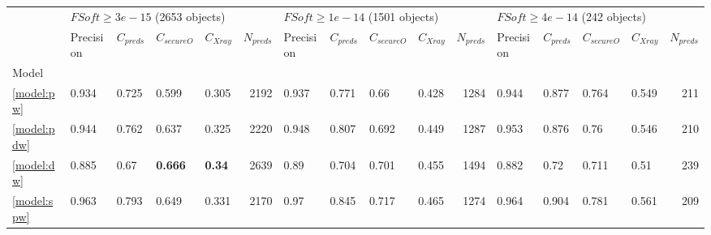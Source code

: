 \documentclass[fleqn,usenatbib]{mnras}
\begin{document}
\begin{table}
	\begin{tabular}{lllllrllllrllllr}
            \hline
            {} & \multicolumn{5}{l}{$FSoft \geq 3e-15$ (2653 objects)} & \multicolumn{5}{l}{$FSoft \geq 1e-14$ (1501 objects)} & \multicolumn{5}{l}{$FSoft \geq 4e-14$ (242 objects)} \\
            {} &                         Precision &     $C_{preds}$ &   $C_{secureO}$ &     $C_{Xray}$ & $N_{preds}$ &                         Precision &     $C_{preds}$ &   $C_{secureO}$ &      $C_{Xray}$ & $N_{preds}$ &                        Precision &     $C_{preds}$ &   $C_{secureO}$ &      $C_{Xray}$ & $N_{preds}$ \\
            Model            &                                   &                 &                 &                &             &                                   &                 &                 &                 &             &                                  &                 &                 &                 &             \\
            \hline
            \ref{model:pw}   &                             0.934 &           0.725 &           0.599 &          0.305 &        2192 &                             0.937 &           0.771 &            0.66 &           0.428 &        1284 &                            0.944 &           0.877 &           0.764 &           0.549 &         211 \\
            \ref{model:pdw}  &                             0.944 &           0.762 &           0.637 &          0.325 &        2220 &                             0.948 &           0.807 &           0.692 &           0.449 &        1287 &                            0.953 &           0.876 &            0.76 &           0.546 &         210 \\
            \ref{model:dw}   &                             0.885 &            0.67 &  \textbf{0.666} &  \textbf{0.34} &        2639 &                              0.89 &           0.704 &           0.701 &           0.455 &        1494 &                            0.882 &            0.72 &           0.711 &            0.51 &         239 \\
            \ref{model:spw}  &                             0.963 &           0.793 &           0.649 &          0.331 &        2170 &                              0.97 &           0.845 &           0.717 &           0.465 &        1274 &                            0.964 &           0.904 &           0.781 &           0.561 &         209 \\

\end{tabular}
\end{table}
\end{document}
